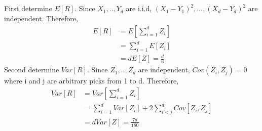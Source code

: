 \documentclass{article}
\begin{document}
\subsection{}
First determine $E[R]$. Since $X_1,..,Y_d$ are i.i.d, $(X_1-Y_1)^2,...,(X_d-Y_d)^2$ are independent. Therefore,
\begin{align*}
    E[R] &= E[\sum_{i = 1}^{d}Z_i]\\
    &= \sum_{i = 1}^{d}E[Z_i]\\
    &= dE[Z] = \frac{d}{6}
\end{align*}
Second determine $Var[R]$. Since $Z_1,..,Z_d$ are independent, $Cov(Z_i,Z_j)=0$ where i and j are arbitrary picks from 1 to d. Therefore,
\begin{align*}
    Var[R] &= Var[\sum_{i = 1}^{d}Z_i]\\
    &= \sum_{i = 1}^{d}Var[Z_i] + 2\sum_{i<j}^{d}Cov[Z_i,Z_j]\\
    &= dVar[Z] = \frac{7d}{180}
\end{align*}
\section{}
\subsection{}
\subsection{}
\subsection{}
\subsection{}
\subsection{}
\subsection{}
\subsection{}
\subsection{}
\subsection{}
\end{document}
